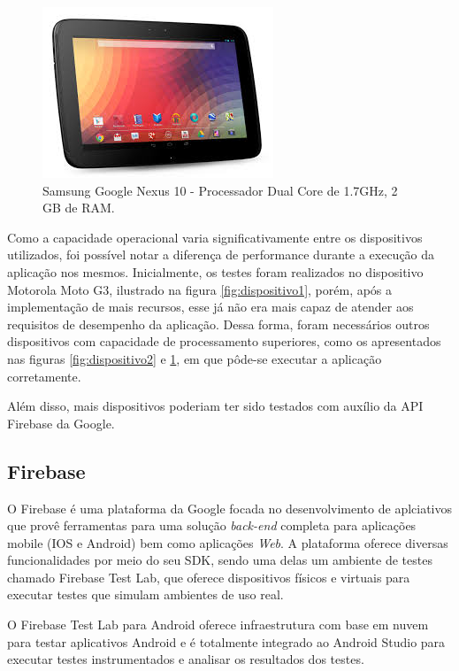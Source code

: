 	\begin{figure}[!htb]
       \begin{center}  
          \includegraphics[width=0.3\columnwidth]{img/dispositivo3.jpg}
           \caption{\label{fig:dispositivo3}Samsung Google Nexus 10 - Processador Dual Core de 1.7GHz, 2 GB de RAM.}
       \end{center}
   \end{figure}

Como a capacidade operacional varia significativamente entre os dispositivos utilizados, foi possível notar a diferença de performance durante a execução da aplicação nos mesmos. Inicialmente, os testes foram realizados no dispositivo Motorola Moto G3, ilustrado na figura \ref{fig:dispositivo1}, porém, após a implementação de mais recursos, esse já não era mais capaz de atender aos requisitos de desempenho da aplicação. Dessa forma, foram necessários outros dispositivos com capacidade de processamento superiores, como os apresentados nas figuras \ref{fig:dispositivo2} e \ref{fig:dispositivo3}, em que pôde-se executar a aplicação corretamente. 

Além disso, mais dispositivos poderiam ter sido testados com auxílio da API Firebase da Google. 

\subsection{Firebase}

O Firebase é uma plataforma da Google focada no desenvolvimento de aplciativos que provê ferramentas para uma solução \textit{back-end} completa para aplicações mobile (IOS e Android) bem como aplicações \textit{Web}. A plataforma oferece diversas funcionalidades por meio do seu SDK, sendo uma delas um ambiente de testes chamado Firebase Test Lab, que oferece dispositivos físicos e virtuais para executar testes que simulam ambientes de uso real. 

O Firebase Test Lab para Android oferece infraestrutura com base em nuvem para testar aplicativos Android e é totalmente integrado ao Android Studio para executar testes instrumentados e analisar os resultados dos testes. \cite{firebasetestlab}

